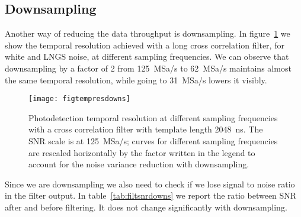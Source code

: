 
\subsection{Downsampling}

Another way of reducing the data throughput is downsampling. In
figure~\ref{fig:tempresdowns} we show the temporal resolution achieved with a
long cross correlation filter, for white and LNGS noise, at different sampling
frequencies. We can observe that downsampling by a factor of 2 from
\SI{125}{MSa/s} to \SI{62}{MSa/s} maintains almost the same temporal
resolution, while going to \SI{31}{MSa/s} lowers it visibly.


\begin{figure}
    \hspace{-0.22\textwidth}
    \texttt{[image: figtempresdowns]}
    
    \caption{Photodetection temporal resolution at different sampling
    frequencies with a cross correlation filter with template length
    \SI{2048}{ns}. The SNR scale is at \SI{125}{MSa/s}; curves for different
    sampling frequencies are rescaled horizontally by the factor written in the
    legend to account for the noise variance reduction with downsampling.}
    
    \label{fig:tempresdowns}
\end{figure}

Since we are downsampling we also need to check if we lose signal to noise
ratio in the filter output. In table~\ref{tab:filtsnrdowns} we report the
ratio between SNR after and before filtering. It does not change significantly
with downsampling.



